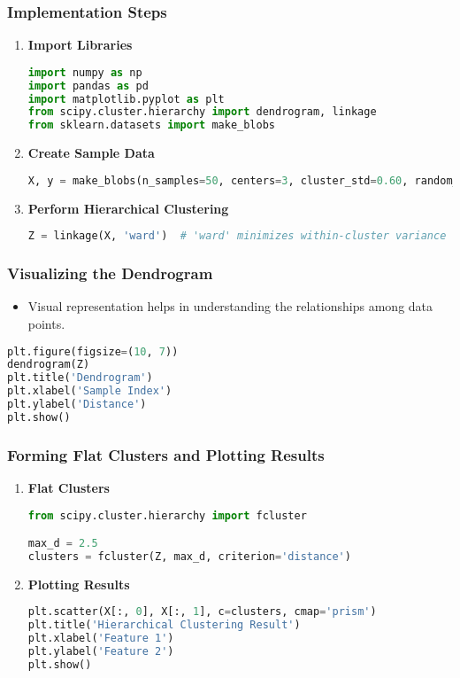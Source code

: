 \documentclass[aspectratio=169]{beamer}
\begin{document}
\begin{frame}[fragile]
    \frametitle{Implementation Steps}
    \begin{enumerate}
        \item \textbf{Import Libraries}
        \begin{lstlisting}[language=Python]
import numpy as np
import pandas as pd
import matplotlib.pyplot as plt
from scipy.cluster.hierarchy import dendrogram, linkage
from sklearn.datasets import make_blobs
        \end{lstlisting}
        
        \item \textbf{Create Sample Data}
        \begin{lstlisting}[language=Python]
X, y = make_blobs(n_samples=50, centers=3, cluster_std=0.60, random_state=0)
        \end{lstlisting}
        
        \item \textbf{Perform Hierarchical Clustering}
        \begin{lstlisting}[language=Python]
Z = linkage(X, 'ward')  # 'ward' minimizes within-cluster variance
        \end{lstlisting}
    \end{enumerate}
\end{frame}

\begin{frame}[fragile]
    \frametitle{Visualizing the Dendrogram}
    \begin{itemize}
        \item Visual representation helps in understanding the relationships among data points.
    \end{itemize}
    \begin{lstlisting}[language=Python]
plt.figure(figsize=(10, 7))
dendrogram(Z)
plt.title('Dendrogram')
plt.xlabel('Sample Index')
plt.ylabel('Distance')
plt.show()
    \end{lstlisting}
\end{frame}

\begin{frame}[fragile]
    \frametitle{Forming Flat Clusters and Plotting Results}
    \begin{enumerate}
        \item \textbf{Flat Clusters}
        \begin{lstlisting}[language=Python]
from scipy.cluster.hierarchy import fcluster

max_d = 2.5
clusters = fcluster(Z, max_d, criterion='distance')
        \end{lstlisting}

        \item \textbf{Plotting Results}
        \begin{lstlisting}[language=Python]
plt.scatter(X[:, 0], X[:, 1], c=clusters, cmap='prism')
plt.title('Hierarchical Clustering Result')
plt.xlabel('Feature 1')
plt.ylabel('Feature 2')
plt.show()
        \end{lstlisting}
    \end{enumerate}
\end{frame}
\end{document}
